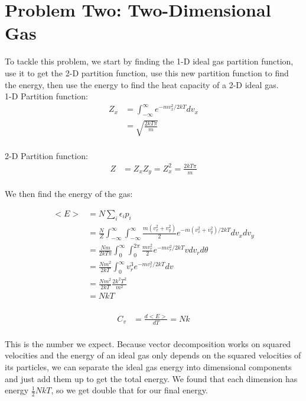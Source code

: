 \documentclass[10pt]{article} %
\begin{document}
\section{Problem Two: Two-Dimensional Gas}
To tackle this problem, we start by finding the 1-D ideal gas partition function, use it to get the
2-D partition function, use this new partition function to find the energy, then use the energy
to find the heat capacity of a 2-D ideal gas.\\

1-D Partition function:
\begin{align*}
  Z_x &= \int_{-\infty}^{\infty} e^{-mv_x^2/2kT} dv_x\\
  &= \sqrt{\frac{2kT\pi}{m}}\\
\end{align*}

2-D Partition function:
\begin{align*}
  Z &= Z_xZ_y = Z_x^2 = \frac{2kT\pi}{m}\\
\end{align*}

We then find the energy of the gas:

\begin{align*}
  <E> &= N\sum_{i} \epsilon_i p_i\\
  &= \frac{N}{Z}\int_{-\infty}^{\infty}\int_{-\infty}^{\infty}
  \frac{m(v_x^2+v_y^2)}{2}e^{-m(v_x^2+v_y^2)/2kT} dv_xdv_y\\
  &= \frac{Nm}{2kT\pi}
  \int_{0}^{\infty}\int_0^{2\pi}\frac{mv_r^2}{2}e^{-mv_r^2/2kT}vdv_rd\theta\\
  &= \frac{Nm^2}{2kT} \int_{0}^{\infty} v_r^3e^{-mv_r^2/2kT}dv\\
  &= \frac{Nm^2}{2kT}\frac{2k^2T^2}{m^2}\\
  &= NkT\\
\end{align*}

\begin{align*}
  C_v &= \frac{d<E>}{dT} = Nk\\
\end{align*}

This is the number we expect. Because vector decomposition works on squared velocities and the
energy of an ideal gas only depends on the squared velocities of its particles, we can separate
the ideal gas energy into dimensional components and just add them up to get the total energy.
We found that each dimension has energy $\frac{1}{2}NkT$, so we get double that for our final
energy.\\
\end{document}
